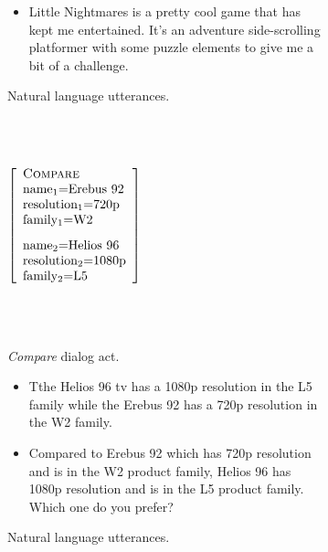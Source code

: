 \begin{figure}[p]
\begin{subfigure}{.58\textwidth}
\begin{itemize}
    \item Little Nightmares is a pretty cool game that has kept me entertained. It's an adventure side-scrolling platformer with some puzzle elements to give me a bit of a challenge.
\end{itemize}
\caption{Natural language utterances.}
\label{fig:mr1utt}
\end{subfigure}


~\\~\\


\begin{subfigure}{.35\textwidth}
\center
$\left[\begin{array}{l} 
    \textsc{Compare} \\ 
    \textrm{name\textsubscript{1}=Erebus 92} \\
    \textrm{resolution\textsubscript{1}=720p} \\
    \textrm{family\textsubscript{1}=W2} \\[8pt]
    
    \textrm{name\textsubscript{2}=Helios 96} \\
    \textrm{resolution\textsubscript{2}=1080p} \\
    \textrm{family\textsubscript{2}=L5} \\
\end{array}\right]$ 

~\\
~\\

\caption{\emph{Compare} dialog act.}\label{fig:compareexample}
\end{subfigure}\hfill \begin{subfigure}{.58\textwidth}
\begin{itemize}
    \item Tthe Helios 96 tv has a 1080p resolution in the L5 family while the Erebus 92 has a 720p resolution in the W2 family. 
    \item Compared to Erebus 92 which has 720p resolution and is in the W2 product family, Helios 96 has 1080p resolution and is in the L5 product family. Which one do you prefer?
\end{itemize}
\caption{Natural language utterances.}
\label{fig:mr1utt}
\end{subfigure}

~\\~\\

\begin{subfigure}{.35\textwidth}
\center


\end{subfigure}
\end{figure}

